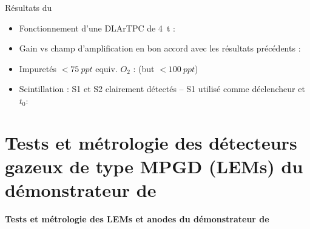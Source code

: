     \begin{frame}{Résultats du \TOO{}}
        \begin{itemize}
           	\item Fonctionnement d'une DLArTPC de \SI{4}{\tonne} : \textcolor{green}{\checkmark}
            \item Gain vs champ d'amplification en bon accord avec les résultats précédents : \textcolor{green}{\checkmark}
         	\item Impuretés $<\SI{75}{ppt}$ equiv. $O_2$ : \textcolor{green}{\checkmark} (but $<\SI{100}{ppt}$)
         	\item Scintillation : S1 et S2 clairement détectés --  S1 utilisé comme déclencheur et $t_0$: \textcolor{green}{\checkmark}
       	\end{itemize}
   	\end{frame}
    
    \section[\SSS{}]{Tests et métrologie des détecteurs gazeux de type MPGD (LEMs) du démonstrateur de \SSS{}}

    {
        \begin{specialframe}
            \vspace{2cm}\hspace*{-1.8cm}\parbox[t]{\textwidth}{
                \begin{center}
                    \begin{huge}
                            \textcolor{pheniics_purple}{\textbf{Tests et métrologie des LEMs et anodes du démonstrateur de \SSS{}}}
                    \end{huge}
                \end{center}
            }
        \end{specialframe}
    }

